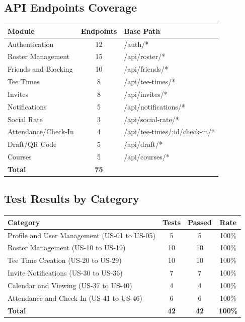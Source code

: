 \documentclass[11pt,a4paper]{article}
\begin{document}
\subsection{API Endpoints Coverage}

\begin{tabular}{|p{5cm}|c|p{6cm}|}
\hline
\rowcolor{lightgray}
\textbf{Module} & \textbf{Endpoints} & \textbf{Base Path} \\
\hline
Authentication & 12 & /auth/* \\
\hline
Roster Management & 15 & /api/roster/* \\
\hline
Friends and Blocking & 10 & /api/friends/* \\
\hline
Tee Times & 8 & /api/tee-times/* \\
\hline
Invites & 8 & /api/invites/* \\
\hline
Notifications & 5 & /api/notifications/* \\
\hline
Social Rate & 3 & /api/social-rate/* \\
\hline
Attendance/Check-In & 4 & /api/tee-times/:id/check-in/* \\
\hline
Draft/QR Code & 5 & /api/draft/* \\
\hline
Courses & 5 & /api/courses/* \\
\hline
\textbf{Total} & \textbf{75} & \\
\hline
\end{tabular}

\subsection{Test Results by Category}

\begin{tabular}{|p{6cm}|c|c|c|}
\hline
\rowcolor{lightgray}
\textbf{Category} & \textbf{Tests} & \textbf{Passed} & \textbf{Rate} \\
\hline
Profile and User Management (US-01 to US-05) & 5 & 5 & 100\% \\
\hline
Roster Management (US-10 to US-19) & 10 & 10 & 100\% \\
\hline
Tee Time Creation (US-20 to US-29) & 10 & 10 & 100\% \\
\hline
Invite Notifications (US-30 to US-36) & 7 & 7 & 100\% \\
\hline
Calendar and Viewing (US-37 to US-40) & 4 & 4 & 100\% \\
\hline
Attendance and Check-In (US-41 to US-46) & 6 & 6 & 100\% \\
\hline
\textbf{Total} & \textbf{42} & \textbf{42} & \textbf{100\%} \\
\hline
\end{tabular}
\end{document}
